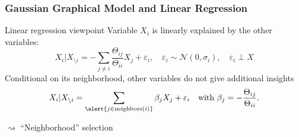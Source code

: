 \begin{frame}
  \frametitle{Gaussian Graphical Model and Linear Regression}

  \begin{block}{Linear regression viewpoint}
    Variable $X_i$ is linearly explained by the other variables:
    \begin{equation*}
      X_i | X_{ \setminus i} = - \sum_{j \neq i}
      \frac{\Theta_{ij}}{\Theta_{ii}} X_j + \varepsilon_i,\quad \varepsilon_i
      \sim \mathcal{N}(0,\sigma_i), \quad \varepsilon_i \perp X
      \end{equation*}
      Conditional  on its  neighborhood,  other variables do not  give
      additional insights
    \begin{equation*}
      X_i | X_{ \setminus i} = \sum_{\alert{j \in \text{neighbors}(i)}} \beta_j X_j + \varepsilon_i
      \quad         \text{with         }         \beta_j         =
      -\frac{\Theta_{ij}}{\Theta_{ii}}.
    \end{equation*}
  \end{block}


  \vfill
  \alert{$\rightsquigarrow$ ``Neighborhood'' selection}

\end{frame}

